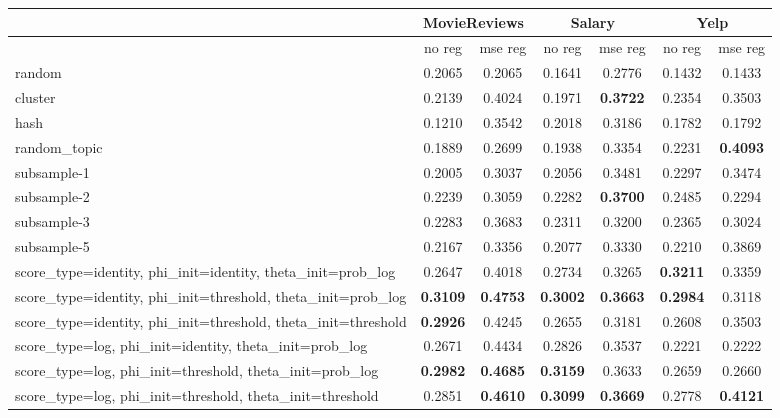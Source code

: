 \documentclass{sig-alternate-2013}
\begin{document}
\begin{table*}
    \centering
    \begin{tabular}{|m{4cm}|c|c|c|c|c|c|}
        \hline
        & \multicolumn{2}{|c|}{MovieReviews} & \multicolumn{2}{|c|}{Salary} & \multicolumn{2}{|c|}{Yelp} \\ \hline
        & no reg & mse reg & no reg & mse reg & no reg & mse reg \\ \hline
        random & 0.2065 & 0.2065 & 0.1641 & 0.2776 & 0.1432 & 0.1433 \\ \hline
        cluster & 0.2139 & 0.4024 & 0.1971 & \textbf{0.3722} & 0.2354 & 0.3503 \\ \hline
        hash & 0.1210 & 0.3542 & 0.2018 & 0.3186 & 0.1782 & 0.1792 \\ \hline
        random\_topic & 0.1889 & 0.2699 & 0.1938 & 0.3354 & 0.2231 & \textbf{0.4093} \\ \hline
        subsample-1 & 0.2005 & 0.3037 & 0.2056 & 0.3481 & 0.2297 & 0.3474 \\ \hline
        subsample-2 & 0.2239 & 0.3059 & 0.2282 & \textbf{0.3700} & 0.2485 & 0.2294 \\ \hline
        subsample-3 & 0.2283 & 0.3683 & 0.2311 & 0.3200 & 0.2365 & 0.3024 \\ \hline
        subsample-5 & 0.2167 & 0.3356 & 0.2077 & 0.3330 & 0.2210 & 0.3869 \\ \hline
        score\_type=identity, phi\_init=identity, theta\_init=prob\_log & 0.2647 & 0.4018 & 0.2734 & 0.3265 & \textbf{0.3211} & 0.3359 \\ \hline
        score\_type=identity, phi\_init=threshold, theta\_init=prob\_log & \textbf{0.3109} & \textbf{0.4753} & \textbf{0.3002} & \textbf{0.3663} & \textbf{0.2984} & 0.3118 \\ \hline
        score\_type=identity, phi\_init=threshold, theta\_init=threshold & \textbf{0.2926} & 0.4245 & 0.2655 & 0.3181 & 0.2608 & 0.3503 \\ \hline
        score\_type=log, phi\_init=identity, theta\_init=prob\_log & 0.2671 & 0.4434 & 0.2826 & 0.3537 & 0.2221 & 0.2222 \\ \hline
        score\_type=log, phi\_init=threshold, theta\_init=prob\_log & \textbf{0.2982} & \textbf{0.4685} & \textbf{0.3159} & 0.3633 & 0.2659 & 0.2660 \\ \hline
        score\_type=log, phi\_init=threshold, theta\_init=threshold & 0.2851 & \textbf{0.4610} & \textbf{0.3099} & \textbf{0.3669} & 0.2778 & \textbf{0.4121} \\ \hline

\end{tabular}
\end{table*}
\end{document}
